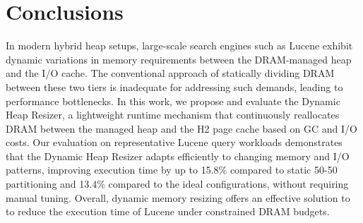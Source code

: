 \section{Conclusions}
In modern hybrid heap setups, large-scale search engines such as 
Lucene exhibit dynamic variations in memory requirements between 
the DRAM-managed heap and the I/O cache. The conventional approach of statically dividing DRAM
between these two tiers is inadequate for addressing such demands, 
leading to performance bottlenecks. In this
work, we propose and evaluate the Dynamic Heap Resizer, a lightweight runtime
mechanism that continuously reallocates DRAM between the managed heap and the
H2 page cache based on GC and I/O costs. Our evaluation on representative Lucene
query workloads demonstrates that the Dynamic Heap Resizer adapts efficiently 
to changing memory and I/O patterns, improving execution time by up to 15.8\% 
compared to static 50-50 partitioning and 13.4\% compared to the ideal configurations, without requiring manual tuning. Overall, 
dynamic memory resizing offers an effective solution to to reduce the execution time 
of Lucene under constrained DRAM budgets.


